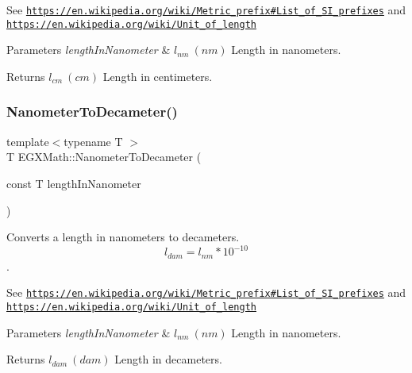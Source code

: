 See \href{https://en.wikipedia.org/wiki/Metric_prefix#List_of_SI_prefixes}{\tt https\+://en.\+wikipedia.\+org/wiki/\+Metric\+\_\+prefix\#\+List\+\_\+of\+\_\+\+S\+I\+\_\+prefixes} and \href{https://en.wikipedia.org/wiki/Unit_of_length}{\tt https\+://en.\+wikipedia.\+org/wiki/\+Unit\+\_\+of\+\_\+length} 
\begin{DoxyParams}{Parameters}
{\em length\+In\+Nanometer} & $ l_{nm}\ (nm)$ Length in nanometers. \\
\hline
\end{DoxyParams}
\begin{DoxyReturn}{Returns}
$ l_{cm}\ (cm)$ Length in centimeters. 
\end{DoxyReturn}
\mbox{\label{group___e_g_x_math-_conversions-_length_conversions-_nanometer-_s_i_gabd4fa6935aab15cac606410d0da3b22d}} 
\subsubsection{\texorpdfstring{Nanometer\+To\+Decameter()}{NanometerToDecameter()}}
{\footnotesize\ttfamily template$<$typename T $>$ \\
T E\+G\+X\+Math\+::\+Nanometer\+To\+Decameter (\begin{DoxyParamCaption}\item[{const T}]{length\+In\+Nanometer }\end{DoxyParamCaption})}



Converts a length in nanometers to decameters. \[ l_{dam}=l_{nm} * 10^{-10} \]. 

See \href{https://en.wikipedia.org/wiki/Metric_prefix#List_of_SI_prefixes}{\tt https\+://en.\+wikipedia.\+org/wiki/\+Metric\+\_\+prefix\#\+List\+\_\+of\+\_\+\+S\+I\+\_\+prefixes} and \href{https://en.wikipedia.org/wiki/Unit_of_length}{\tt https\+://en.\+wikipedia.\+org/wiki/\+Unit\+\_\+of\+\_\+length} 
\begin{DoxyParams}{Parameters}
{\em length\+In\+Nanometer} & $ l_{nm}\ (nm)$ Length in nanometers. \\
\hline
\end{DoxyParams}
\begin{DoxyReturn}{Returns}
$ l_{dam}\ (dam)$ Length in decameters. 
\end{DoxyReturn}
\mbox{\label{group___e_g_x_math-_conversions-_length_conversions-_nanometer-_s_i_ga3be41b7dc346f2f5745d761c9f6c743d}} 
